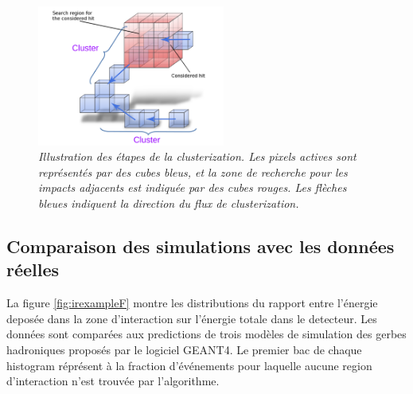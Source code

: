 \begin{figure}
	\centering
	\includegraphics[width=0.55\textwidth]{ECAL/graphics/demo-v3.pdf}
	\caption{\label{fig:democlusterF} \sl Illustration des étapes de la clusterization. Les pixels actives sont représentés par des cubes bleus, et la zone de recherche pour les impacts adjacents est indiquée par des cubes rouges. Les flèches bleues indiquent la direction du flux de clusterization.}
\end{figure}

\newpage
\subsection*{Comparaison des simulations avec les données réelles}
La figure \ref{fig:irexampleF} montre les distributions du rapport entre l'énergie deposée dans la zone d'interaction sur l'énergie totale dans le detecteur. Les données sont comparées aux predictions de trois modèles de simulation des gerbes hadroniques proposés par le logiciel GEANT4.  
Le premier bac de chaque histogram  réprésent à la fraction d'événements pour laquelle aucune region d'interaction n'est trouvée par l'algorithme.


